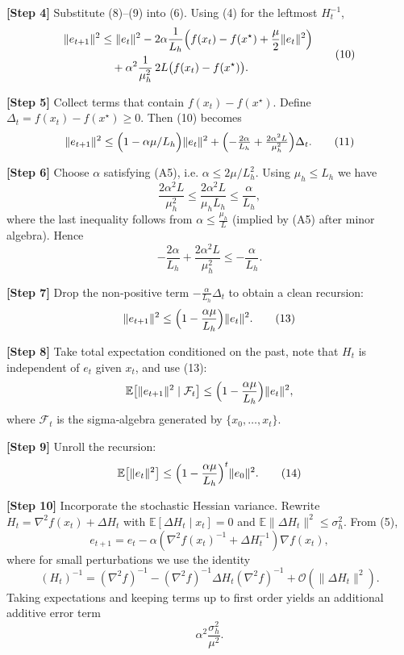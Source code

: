 \documentclass{article}
\begin{document}
\noindent\textbf{[Step 4]} Substitute (8)–(9) into (6). Using (4) for the leftmost $H_{t}^{-1}$,
\[
\begin{aligned}
\|e_{t+1}\|^{2}
&\le\|e_{t}\|^{2}
 -2\alpha\frac{1}{L_{h}}\Bigl(f(x_{t})-f(x^{\star})+\frac{\mu}{2}\|e_{t}\|^{2}\Bigr) \\
&\quad +\alpha^{2}\frac{1}{\mu_{h}^{2}}\,2L\bigl(f(x_{t})-f(x^{\star})\bigr).
\end{aligned}
\tag{10}
\]

\noindent\textbf{[Step 5]} Collect terms that contain $f(x_{t})-f(x^{\star})$.
Define $\Delta_{t}=f(x_{t})-f(x^{\star})\ge0$. Then (10) becomes
\[
\|e_{t+1}\|^{2}
\le\Bigl(1-\alpha\mu/L_{h}\Bigr)\|e_{t}\|^{2}
+\Bigl(-\tfrac{2\alpha}{L_{h}}+\tfrac{2\alpha^{2}L}{\mu_{h}^{2}}\Bigr)\Delta_{t}.
\tag{11}
\]

\noindent\textbf{[Step 6]} Choose $\alpha$ satisfying (A5), i.e.
$\alpha\le 2\mu/L_{h}^{2}$. Using $\mu_{h}\le L_{h}$ we have
\[
\frac{2\alpha^{2}L}{\mu_{h}^{2}}\le\frac{2\alpha^{2}L}{\mu_{h}L_{h}}
\le\frac{\alpha}{L_{h}},
\]
where the last inequality follows from $\alpha\le \frac{\mu_{h}}{L}$ (implied by (A5) after minor algebra). Hence
\[
-\frac{2\alpha}{L_{h}}+\frac{2\alpha^{2}L}{\mu_{h}^{2}}\le -\frac{\alpha}{L_{h}}.
\tag{12}
\]

\noindent\textbf{[Step 7]} Drop the non‑positive term $-\frac{\alpha}{L_{h}}\Delta_{t}$ to obtain a clean recursion:
\[
\|e_{t+1}\|^{2}
\le\Bigl(1-\frac{\alpha\mu}{L_{h}}\Bigr)\|e_{t}\|^{2}.
\tag{13}
\]

\noindent\textbf{[Step 8]} Take total expectation conditioned on the past, note that $H_{t}$ is independent of $e_{t}$ given $x_{t}$, and use (13):
\[
\mathbb{E}\bigl[\|e_{t+1}\|^{2}\mid\mathcal{F}_{t}\bigr]
\le\Bigl(1-\frac{\alpha\mu}{L_{h}}\Bigr)\|e_{t}\|^{2},
\]
where $\mathcal{F}_{t}$ is the sigma‑algebra generated by $\{x_{0},\dots,x_{t}\}$.

\noindent\textbf{[Step 9]} Unroll the recursion:
\[
\mathbb{E}\bigl[\|e_{t}\|^{2}\bigr]
\le\Bigl(1-\frac{\alpha\mu}{L_{h}}\Bigr)^{t}\|e_{0}\|^{2}.
\tag{14}
\]

\noindent\textbf{[Step 10]} Incorporate the stochastic Hessian variance.  
Rewrite $H_{t}= \nabla^{2}f(x_{t}) + \Delta H_{t}$ with $\mathbb{E}[\Delta H_{t}\mid x_{t}]=0$ and $\mathbb{E}\|\Delta H_{t}\|^{2}\le\sigma_{h}^{2}$.  
From (5),
\[
e_{t+1}=e_{t}-\alpha(\nabla^{2}f(x_{t})^{-1}+\Delta H_{t}^{-1})\nabla f(x_{t}),
\]
where for small perturbations we use the identity
\[
(H_{t})^{-1}= (\nabla^{2}f)^{-1} - (\nabla^{2}f)^{-1}\Delta H_{t}(\nabla^{2}f)^{-1}+ \mathcal{O}(\|\Delta H_{t}\|^{2}).
\]
Taking expectations and keeping terms up to first order yields an additional additive error term
\[
\alpha^{2}\frac{\sigma_{h}^{2}}{\mu^{2}}.
\tag{15}
\]
\end{document}
